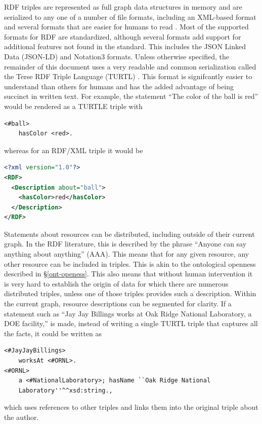 RDF triples are represented as full graph data structures in memory and are
serialized to any one of a number of file formats, including an XML-based format
and several formats that are easier for humans to read \cite{noauthor_resource_2019}.
Most of the supported formats for RDF are standardized, although several formats
add support for additional features not found in the standard. This includes the
JSON Linked Data (JSON-LD) and Notation3 formats. Unless otherwise
specified, the remainder of this document uses a very readable and common
serialization called the Terse RDF Triple Language (TURTL)
\cite{noauthor_rdf_nodate-4}. This format is signifcantly easier to understand
than others for humans and has the added advantage of being succinct in written
text. For example, the statement ``The color of the ball is red'' would be
rendered as a TURTLE triple with \begin{lstlisting}[language=TURTL]
<#ball>
    hasColor <red>.
\end{lstlisting}
whereas for an RDF/XML triple it would be
\begin{lstlisting}[language=XML]
<?xml version="1.0"?>
<RDF>
  <Description about="ball">
    <hasColor>red</hasColor>
  </Description>
</RDF>
\end{lstlisting}

Statements about resources can be distributed, including outside of their
current graph. In the RDF literature, this is described by the phrase ``Anyone
can say anything about anything'' (AAA). This means that for any given resource,
any other resource can be included in triples. This is akin to the ontological
openness described in \S \ref{ont-openess}. This also means that without human
intervention it is very hard to establish the origin of data for which there are
numerous distributed triples, unless one of those triples provides such a
description. Within the current graph, resource descriptions can be segmented
for clarity. If a statement such as ``Jay Jay Billings works at Oak Ridge
National Laboratory, a DOE facility,'' is made, instead of writing a single
TURTL triple that captures all the facts, it could be written as
\begin{lstlisting}[language=TURTL] <#JayJayBillings>
    worksAt <#ORNL>.
<#ORNL>
    a <#NationalLaboratory>; hasName ``Oak Ridge National
    Laboratory''^^xsd:string.,
\end{lstlisting}
which uses references to other triples and links them into the original triple
about the author.

